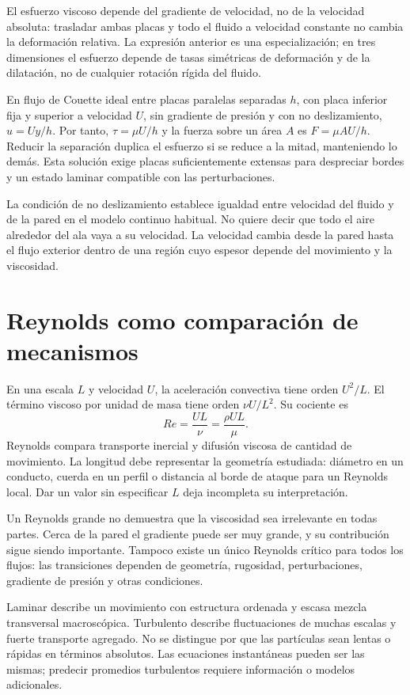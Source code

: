 El esfuerzo viscoso depende del gradiente de velocidad, no de la velocidad absoluta: trasladar ambas placas y todo el fluido a velocidad constante no cambia la deformación relativa. La expresión anterior es una especialización; en tres dimensiones el esfuerzo depende de tasas simétricas de deformación y de la dilatación, no de cualquier rotación rígida del fluido.

En flujo de Couette ideal entre placas paralelas separadas $h$, con placa inferior fija y superior a velocidad $U$, sin gradiente de presión y con no deslizamiento, $u=Uy/h$. Por tanto, $\tau=\mu U/h$ y la fuerza sobre un área $A$ es $F=\mu AU/h$. Reducir la separación duplica el esfuerzo si se reduce a la mitad, manteniendo lo demás. Esta solución exige placas suficientemente extensas para despreciar bordes y un estado laminar compatible con las perturbaciones.

La condición de no deslizamiento establece igualdad entre velocidad del fluido y de la pared en el modelo continuo habitual. No quiere decir que todo el aire alrededor del ala vaya a su velocidad. La velocidad cambia desde la pared hasta el flujo exterior dentro de una región cuyo espesor depende del movimiento y la viscosidad.

\section{Reynolds como comparación de mecanismos}
En una escala $L$ y velocidad $U$, la aceleración convectiva tiene orden $U^2/L$. El término viscoso por unidad de masa tiene orden $\nu U/L^2$. Su cociente es
\begin{equation}\label{eq:06-Re}
 Re=\frac{UL}{\nu}=\frac{\rho UL}{\mu}.
\end{equation}
Reynolds compara transporte inercial y difusión viscosa de cantidad de movimiento. La longitud debe representar la geometría estudiada: diámetro en un conducto, cuerda en un perfil o distancia al borde de ataque para un Reynolds local. Dar un valor sin especificar $L$ deja incompleta su interpretación.

Un Reynolds grande no demuestra que la viscosidad sea irrelevante en todas partes. Cerca de la pared el gradiente puede ser muy grande, y su contribución sigue siendo importante. Tampoco existe un único Reynolds crítico para todos los flujos: las transiciones dependen de geometría, rugosidad, perturbaciones, gradiente de presión y otras condiciones.

Laminar describe un movimiento con estructura ordenada y escasa mezcla transversal macroscópica. Turbulento describe fluctuaciones de muchas escalas y fuerte transporte agregado. No se distingue por que las partículas sean lentas o rápidas en términos absolutos. Las ecuaciones instantáneas pueden ser las mismas; predecir promedios turbulentos requiere información o modelos adicionales.

